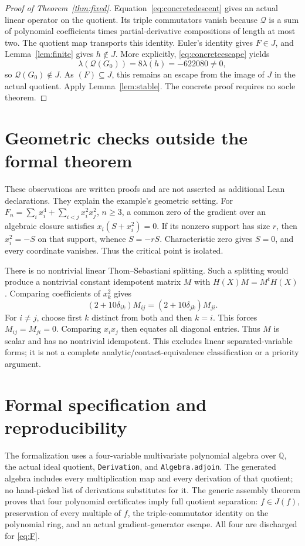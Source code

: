 \documentclass[11pt,letterpaper]{article}
\theoremstyle{remark}\newtheorem{remark}[theorem]{Remark}
\newcommand{\QQ}{\mathbb Q}
\begin{document}
\begin{proof}[Proof of Theorem~\ref{thm:fixed}]
Equation~\eqref{eq:concretedescent} gives an actual linear operator on the
quotient. Its triple commutators vanish because \(\mathcal Q\) is a sum of
polynomial coefficients times partial-derivative compositions of length at
most two. The quotient map transports this identity.
Euler's identity gives \(F\in J\), and Lemma~\ref{lem:finite} gives
\(h\notin J\). More explicitly, \eqref{eq:concreteescape} yields
\[
 \lambda(\mathcal Q(G_0))=8\lambda(h)=-622080\ne0,
\]
so \(\mathcal Q(G_0)\notin J\). As \((F)\subseteq J\), this remains an
escape from the image of \(J\) in the actual quotient. Apply
Lemma~\ref{lem:stable}. The concrete proof requires no socle theorem.
\end{proof}

\section{Geometric checks outside the formal theorem}
These observations are written proofs and are not asserted as additional
Lean declarations. They explain the example's geometric setting.
For \(F_n=\sum_i x_i^4+\sum_{i<j}x_i^2x_j^2\), \(n\ge3\), a common zero
of the gradient over an algebraic closure satisfies
\(x_i(S+x_i^2)=0\). If its nonzero support has size \(r\), then
\(x_i^2=-S\) on that support, whence \(S=-rS\). Characteristic zero gives
\(S=0\), and every coordinate vanishes. Thus the critical point is isolated.

There is no nontrivial linear Thom--Sebastiani splitting. Such a splitting
would produce a nontrivial constant idempotent matrix \(M\) with
\(H(X)M=M^tH(X)\). Comparing coefficients of \(x_k^2\) gives
\[
 (2+10\delta_{ik})M_{ij}=(2+10\delta_{jk})M_{ji}.
\]
For \(i\ne j\), choose first \(k\) distinct from both and then \(k=i\).
This forces \(M_{ij}=M_{ji}=0\). Comparing \(x_ix_j\) then equates all
diagonal entries. Thus \(M\) is scalar and has no nontrivial idempotent.
This excludes linear separated-variable forms; it is not a complete
analytic/contact-equivalence classification or a priority argument.

\section{Formal specification and reproducibility}
The formalization uses a four-variable multivariate polynomial algebra over
\(\QQ\), the actual ideal
quotient, \texttt{Derivation}, and \texttt{Algebra.adjoin}. The generated
algebra includes every multiplication map and every derivation of that
quotient; no hand-picked list of derivations substitutes for it.
The generic assembly theorem proves that four polynomial certificates imply
full quotient separation: \(f\in J(f)\), preservation of every multiple of
\(f\), the triple-commutator identity on the polynomial ring, and an actual
gradient-generator escape. All four are discharged for \eqref{eq:F}.
\end{document}
